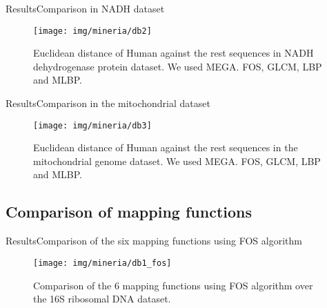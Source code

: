 \documentclass[10pt]{beamer}
\newcommand{\1}{
	\setbeamertemplate{background}{
		\texttt{[image: img/1\_dna]}
		\tikz[overlay] \fill[fill opacity=0.75,fill=white] (0,0) rectangle (-\paperwidth,\paperheight);
	}
}
\begin{document}
\begin{frame}{Results}{Comparison in NADH  dataset}
	\begin{figure}[hbt!]
		\centering
		\texttt{[image: img/mineria/db2]}
		\caption{Euclidean distance of Human against the rest sequences in NADH dehydrogenase protein dataset. We used MEGA. FOS, GLCM, LBP and MLBP.}
		\label{img:comp2}
	\end{figure}
\end{frame}

\begin{frame}{Results}{Comparison in the mitochondrial dataset}
\begin{figure}[hbt!]
	\centering
	\texttt{[image: img/mineria/db3]}
	\caption{Euclidean distance of Human against the rest sequences in the mitochondrial genome dataset. We used MEGA. FOS, GLCM, LBP and MLBP.}
	\label{img:comp3}
\end{figure}
\end{frame}

\subsection{Comparison of mapping functions}


\begin{frame}{Results}{Comparison of the six mapping functions using FOS algorithm}
	\begin{figure}[]
		\centering
		\texttt{[image: img/mineria/db1\_fos]}
		\caption{Comparison of the 6 mapping functions using FOS algorithm over the 16S ribosomal DNA dataset.}
		\label{img:comp3}
	\end{figure}
\end{frame}
\end{document}
